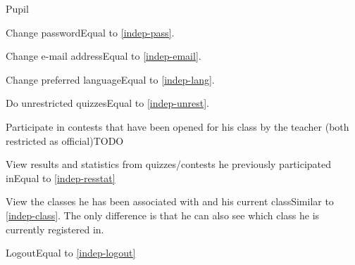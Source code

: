 \begin{section}{Pupil}

    \begin{subsection}{Change password}Equal to \ref{indep-pass}.\end{subsection}
    \begin{subsection}{Change e-mail address}Equal to \ref{indep-email}.\end{subsection}
    \begin{subsection}{Change preferred language}Equal to \ref{indep-lang}.\end{subsection}
    \begin{subsection}{Do unrestricted quizzes}Equal to \ref{indep-unrest}.\end{subsection}
    \begin{subsection}{Participate in contests that have been opened for his class by the teacher (both restricted as official)}TODO\end{subsection}
    \begin{subsection}{View results and statistics from quizzes/contests he previously participated in}Equal to \ref{indep-resstat}\end{subsection}
    \begin{subsection}{View the classes he has been associated with and his current class}Similar to \ref{indep-class}. The only difference is that he can also see which class he is currently registered in.\end{subsection}
	\begin{subsection}{Logout}Equal to \ref{indep-logout}\end{subsection}

\end{section}